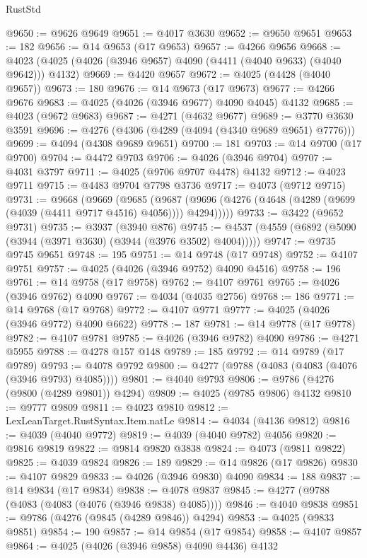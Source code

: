 \begin{lexlean}{RustStd}
\begin{coremodule}
@9650 := @9626 @9649
@9651 := @4017 @3630
@9652 := @9650 @9651
@9653 := 182
@9656 := @14 @9653 (@17 @9653)
@9657 := @4266 @9656
@9668 := @4023 (@4025 (@4026 (@3946 @9657) @4090 (@4411 (@4040 @9633) (@4040 @9642))) @4132)
@9669 := @4420 @9657
@9672 := @4025 (@4428 (@4040 @9657))
@9673 := 180
@9676 := @14 @9673 (@17 @9673)
@9677 := @4266 @9676
@9683 := @4025 (@4026 (@3946 @9677) @4090 @4045) @4132
@9685 := @4023 (@9672 @9683)
@9687 := @4271 (@4632 @9677)
@9689 := @3770 @3630 @3591
@9696 := @4276 (@4306 (@4289 (@4094 (@4340 @9689 @9651) @7776)))
@9699 := @4094 (@4308 @9689 @9651)
@9700 := 181
@9703 := @14 @9700 (@17 @9700)
@9704 := @4472 @9703
@9706 := @4026 (@3946 @9704)
@9707 := @4031 @3797
@9711 := @4025 (@9706 @9707 @4478) @4132
@9712 := @4023 @9711
@9715 := @4483 @9704 @7798 @3736
@9717 := @4073 (@9712 @9715)
@9731 := @9668
    (@9669
      (@9685
        (@9687 (@9696 (@4276 (@4648 (@4289 (@9699 (@4039 (@4411 @9717 @4516) @4056)))) @4294)))))
@9733 := @3422 (@9652 @9731)
@9735 := @3937 (@3940 @876)
@9745 := @4537 (@4559 (@6892 (@5090 (@3944 (@3971 @3630) (@3944 (@3976 @3502) @4004)))))
@9747 := @9735 @9745 @9651
@9748 := 195
@9751 := @14 @9748 (@17 @9748)
@9752 := @4107 @9751
@9757 := @4025 (@4026 (@3946 @9752) @4090 @4516)
@9758 := 196
@9761 := @14 @9758 (@17 @9758)
@9762 := @4107 @9761
@9765 := @4026 (@3946 @9762) @4090
@9767 := @4034 (@4035 @2756)
@9768 := 186
@9771 := @14 @9768 (@17 @9768)
@9772 := @4107 @9771
@9777 := @4025 (@4026 (@3946 @9772) @4090 @6622)
@9778 := 187
@9781 := @14 @9778 (@17 @9778)
@9782 := @4107 @9781
@9785 := @4026 (@3946 @9782) @4090
@9786 := @4271 @5955
@9788 := @4278 @157 @148
@9789 := 185
@9792 := @14 @9789 (@17 @9789)
@9793 := @4078 @9792
@9800 := @4277 (@9788 (@4083 (@4083 (@4076 (@3946 @9793) @4085))))
@9801 := @4040 @9793
@9806 := @9786 (@4276 (@9800 (@4289 @9801)) @4294)
@9809 := @4025 (@9785 @9806) @4132
@9810 := @9777 @9809
@9811 := @4023 @9810
@9812 := LexLeanTarget.RustSyntax.Item.natLe
@9814 := @4034 (@4136 @9812)
@9816 := @4039 (@4040 @9772)
@9819 := @4039 (@4040 @9782) @4056
@9820 := @9816 @9819
@9822 := @9814 @9820 @3838
@9824 := @4073 (@9811 @9822)
@9825 := @4039 @9824
@9826 := 189
@9829 := @14 @9826 (@17 @9826)
@9830 := @4107 @9829
@9833 := @4026 (@3946 @9830) @4090
@9834 := 188
@9837 := @14 @9834 (@17 @9834)
@9838 := @4078 @9837
@9845 := @4277 (@9788 (@4083 (@4083 (@4076 (@3946 @9838) @4085))))
@9846 := @4040 @9838
@9851 := @9786 (@4276 (@9845 (@4289 @9846)) @4294)
@9853 := @4025 (@9833 @9851)
@9854 := 190
@9857 := @14 @9854 (@17 @9854)
@9858 := @4107 @9857
@9864 := @4025 (@4026 (@3946 @9858) @4090 @4436) @4132

\end{coremodule}
\end{lexlean}
